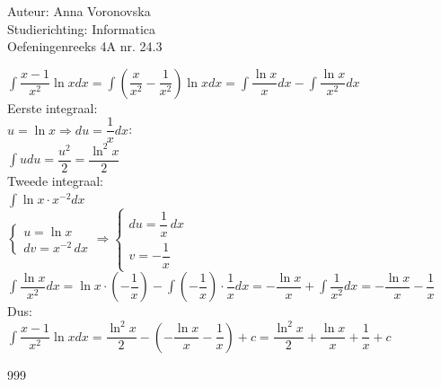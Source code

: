 \documentclass[a4paper]{article}
\begin{document}
  
\noindent \large Auteur: Anna Voronovska \\
\noindent \large Studierichting: Informatica\\
\noindent \large Oefeningenreeks 4A nr. 24.3\\

\medskip

\normalsize
$\displaystyle\int \dfrac{x-1}{x^2} \ln xdx = \displaystyle\int \left( \dfrac{x}{x^2} - \dfrac{1}{x^2} \right) \ln xdx = \displaystyle\int \dfrac{\ln x}{x}dx - \displaystyle\int \dfrac{\ln x}{x^2}dx $\\

Eerste integraal:\\

$u = \ln x \Rightarrow du = \dfrac{1}{x}dx$:\\

$ \displaystyle\int udu = \dfrac{u^2}{2} = \dfrac{\ln^2 x}{2}$\\

Tweede integraal:\\

$\displaystyle\int \ln x \cdot x^{-2}dx$\\

$\left\{ \begin{array}{l} 
    u = \ln x \\ 
    dv = x^{-2} \, dx 
\end{array} \right.
\Rightarrow
\left\{ \begin{array}{l} 
    du = \dfrac{1}{x} \, dx \\ 
    v = -\dfrac{1}{x} 
\end{array} \right.$\\

$\displaystyle\int \dfrac{\ln x}{x^2}dx = \ln x \cdot \left( -\dfrac{1}{x} \right) - \displaystyle\int \left( -\dfrac{1}{x} \right) \cdot \dfrac{1}{x}dx = -\dfrac{\ln x}{x} + \displaystyle\int \dfrac{1}{x^2}dx = -\dfrac{\ln x}{x} - \dfrac{1}{x}$\\

Dus:\\

$\displaystyle\int \dfrac{x-1}{x^2} \ln xdx = \dfrac{\ln^2 x}{2} - \left( -\dfrac{\ln x}{x} - \dfrac{1}{x} \right) + c = \dfrac{\ln^2 x}{2} + \dfrac{\ln x}{x} + \dfrac{1}{x} + c$

\begin{thebibliography}{999}
\end{thebibliography}
\end{document}
